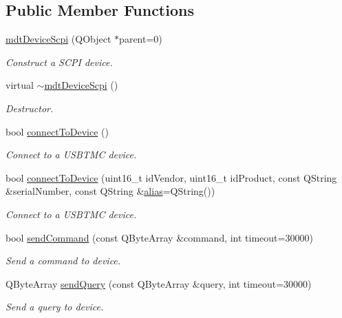 \subsection*{Public Member Functions}
\begin{DoxyCompactItemize}
\item 
\hyperlink{classmdt_device_scpi_a44c03151a6796e5c1efd64ef55f2d14d}{mdt\-Device\-Scpi} (Q\-Object $\ast$parent=0)
\begin{DoxyCompactList}\small\item\em Construct a S\-C\-P\-I device. \end{DoxyCompactList}\item 
virtual \hyperlink{classmdt_device_scpi_ae173b9ad3d528005e124624ca9bb7b64}{$\sim$mdt\-Device\-Scpi} ()
\begin{DoxyCompactList}\small\item\em Destructor. \end{DoxyCompactList}\item 
bool \hyperlink{classmdt_device_scpi_a4d3eca756dea1165f1f5da3e325d1d49}{connect\-To\-Device} ()
\begin{DoxyCompactList}\small\item\em Connect to a U\-S\-B\-T\-M\-C device. \end{DoxyCompactList}\item 
bool \hyperlink{classmdt_device_scpi_a789b3eabacd10da13ddb4a44ea9b0c35}{connect\-To\-Device} (uint16\-\_\-t id\-Vendor, uint16\-\_\-t id\-Product, const Q\-String \&serial\-Number, const Q\-String \&\hyperlink{classmdt_device_a3aa589ecae0fa3deed61431d07db9276}{alias}=Q\-String())
\begin{DoxyCompactList}\small\item\em Connect to a U\-S\-B\-T\-M\-C device. \end{DoxyCompactList}\item 
bool \hyperlink{classmdt_device_scpi_a59759a6138c3ecbcb5cb98a042f8bcb5}{send\-Command} (const Q\-Byte\-Array \&command, int timeout=30000)
\begin{DoxyCompactList}\small\item\em Send a command to device. \end{DoxyCompactList}\item 
Q\-Byte\-Array \hyperlink{classmdt_device_scpi_a6dd5bd26c3178c5ba150d813a91e67c9}{send\-Query} (const Q\-Byte\-Array \&query, int timeout=30000)
\begin{DoxyCompactList}\small\item\em Send a query to device. \end{DoxyCompactList}\item 

\end{DoxyCompactItemize}
